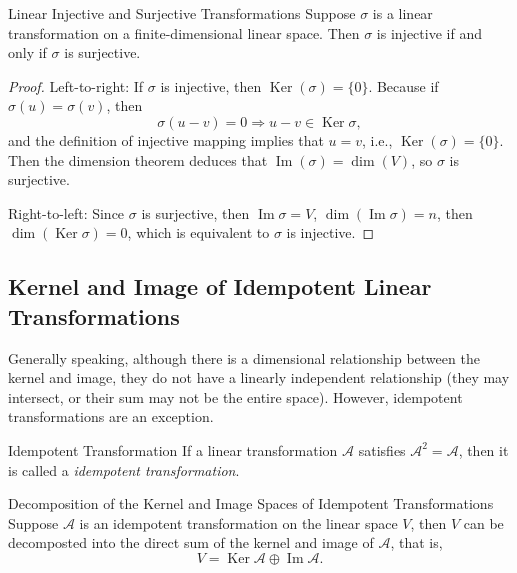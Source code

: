 \begin{proposition}{Linear Injective and Surjective Transformations}{}
  Suppose $\sigma$ is a linear transformation on a finite-dimensional linear space.
  Then $\sigma$ is injective if and only if $\sigma$ is surjective.
\end{proposition}

\begin{proof}
  Left-to-right: If $\sigma$ is injective, then $\operatorname{Ker}(\sigma) = \{0\}$.
  Because if $\sigma(u) = \sigma(v)$, then
  \begin{equation}
  \sigma(u - v) = 0 \Rightarrow u - v \in \operatorname{Ker} \sigma,
  \end{equation}
  and the definition of injective mapping implies that $u = v$, i.e.,
  $\operatorname{Ker}(\sigma) = \{0\}$. Then the dimension theorem deduces that
  $\operatorname{Im}(\sigma) = \operatorname{dim}(V)$,
  so $\sigma$ is surjective.

  Right-to-left: Since $\sigma$ is surjective, then $\operatorname{Im}\sigma =
  V$, $\operatorname{dim}(\operatorname{Im} \sigma) = n$,
  then $\operatorname{dim}(\operatorname{Ker} \sigma) = 0$,
  which is equivalent to $\sigma$ is injective.
\end{proof}

\subsection{Kernel and Image of Idempotent Linear Transformations}

Generally speaking, although there is a dimensional relationship between the
kernel and image, they do not have a linearly independent relationship
(they may intersect, or their sum may not be the entire space).
However, idempotent transformations are an exception.

\begin{definition}{Idempotent Transformation}{}
  If a linear transformation $\mathcal{A}$ satisfies $\mathcal{A}^2 =
  \mathcal{A}$,
  then it is called a \emph{idempotent transformation}.
\end{definition}

\begin{theorem}{Decomposition of the Kernel and Image Spaces of Idempotent Transformations}{}
  Suppose $\mathcal{A}$ is an idempotent transformation on the linear space $V$,
  then $V$ can be decomposted into the direct sum of the kernel and image of
  $\mathcal{A}$,
  that is,
  \begin{equation}
    V = \operatorname{Ker} \mathcal{A} \oplus \operatorname{Im} \mathcal{A}.
  \end{equation}
\end{theorem}

